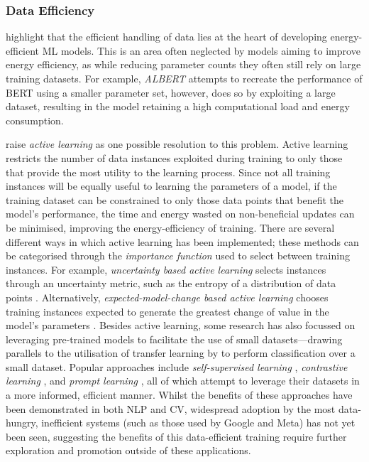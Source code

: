 \documentclass[a4paper, 12pt]{article}
\begin{document}
    \subsubsection{Data Efficiency}

    \citet{aljarrah-2015} highlight that the efficient handling of data lies at the heart of developing energy-efficient ML models. This is an area often neglected by models aiming to improve energy efficiency, as while reducing parameter counts they often still rely on large training datasets. For example, \emph{ALBERT} \citep{lan-2020} attempts to recreate the performance of BERT using a smaller parameter set, however, does so by exploiting a large dataset, resulting in the model retaining a high computational load and energy consumption. 

    \citet{xu-2021} raise \emph{active learning} as one possible resolution to this problem. Active learning restricts the number of data instances exploited during training to only those that provide the most utility to the learning process. Since not all training instances will be equally useful to learning the parameters of a model, if the training dataset can be constrained to only those data points that benefit the model's performance, the time and energy wasted on non-beneficial updates can be minimised, improving the energy-efficiency of training. There are several different ways in which active learning has been implemented; these methods can be categorised through the \emph{importance function} used to select between training instances. For example, \emph{uncertainty based active learning} selects instances through an uncertainty metric, such as the entropy of a distribution of data points \citep{joshi-2009}. Alternatively, \emph{expected-model-change based active learning} chooses training instances expected to generate the greatest change of value in the model's parameters \citep{freytag-2014}. Besides active learning, some research has also focussed on leveraging pre-trained models to facilitate the use of small datasets---drawing parallels to the utilisation of transfer learning by \citet{wang-2020} to perform classification over a small dataset. Popular approaches include \emph{self-supervised learning} \citep{jing-2019}, \emph{contrastive learning} \citep{chen-2020}, and \emph{prompt learning} \citep{liu-2021b}, all of which attempt to leverage their datasets in a more informed, efficient manner. Whilst the benefits of these approaches have been demonstrated in both NLP and CV, widespread adoption by the most data-hungry, inefficient systems (such as those used by Google and Meta) has not yet been seen, suggesting the benefits of this data-efficient training require further exploration and promotion outside of these applications.
\end{document}
